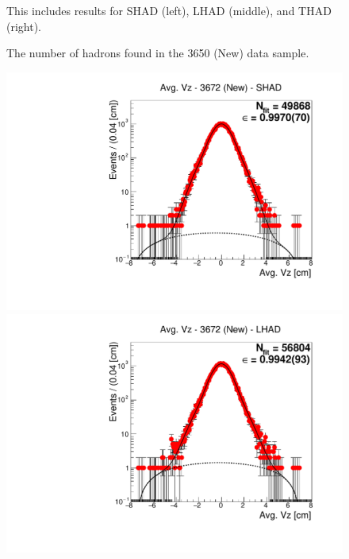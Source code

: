 \begin{figure}[H]
\caption{The number of hadrons found in the 3650 (New) data sample.}
{This includes results for SHAD (left), LHAD (middle), and THAD (right).}
\label{fig:hadron_fits_3650_new}
\end{figure}


\begin{figure}[H]
\centering
\includegraphics[scale=0.25]{figures/plots/nonDDbar_fit_results/3650_new/fit_new_3671_data_SHAD.pdf}
\hspace{-0.5cm}
\includegraphics[scale=0.25]{figures/plots/nonDDbar_fit_results/3650_new/fit_new_3671_data_LHAD.pdf}
\hspace{-0.5cm}

\end{figure}
